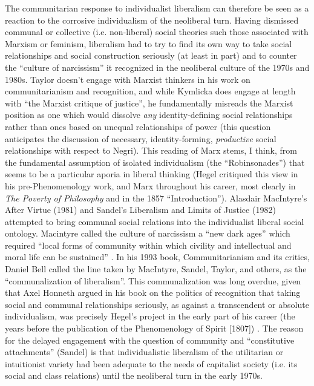 \documentclass[12pt,oneside]{memoir}
\begin{document}
The communitarian response to individualist liberalism can therefore be seen as a reaction to the corrosive individualism of the neoliberal turn. Having dismissed communal or collective (i.e. non-liberal) social theories such those associated with Marxism or feminism, liberalism had to try to find its own way to take social relationships and social construction seriously (at least in part) and to counter the ``culture of narcissism'' it recognized in the neoliberal culture of the 1970s and 1980s. Taylor doesn't engage with Marxist thinkers in his work on communitarianism and recognition, and while Kymlicka does engage at length with ``the Marxist critique of justice'', he fundamentally misreads the Marxist position as one which would dissolve \textit{any} identity-defining social relationships rather than ones based on unequal relationships of power \cite[102]{Kymlicka1989} (this question anticipates the discussion of necessary, identity-forming, \textit{productive} social relationships with respect to Negri). This reading of Marx stems, I think, from the fundamental assumption of isolated individualism (the ``Robinsonades'') that seems to be a particular aporia in liberal thinking (Hegel critiqued this view in his pre-Phenomenology work, and Marx throughout his career, most clearly in \textit{The Poverty of Philosophy} and in the 1857 ``Introduction'').
	 Alasdair MacIntyre's After Virtue (1981) and Sandel's Liberalism and Limits of Justice (1982)  attempted to bring communal social relations into the individualist liberal social ontology. Macintyre called the culture of narcissism a ``new dark ages'' which required ``local forms of community within which civility and intellectual and moral life can be sustained'' \citep{Macintyre1981}. In his 1993 book, Communitarianism and its critics, Daniel Bell called the line taken by MacIntyre, Sandel, Taylor, and others, as the ``communalization of liberalism''. This communalization was long overdue, given that Axel Honneth argued in his book on the politics of recognition that taking social and communal relationships seriously, as against a transcendent or absolute individualism, was precisely Hegel's project in the early part of his career (the years before the publication of the Phenomenology of Spirit [1807]) \citep{honneth-struggle}. The reason for the delayed engagement with the question of community and ``constitutive attachments'' (Sandel) is that individualistic liberalism of the utilitarian or intuitionist variety had been adequate to the needs of capitalist society (i.e. its social and class relations) until the neoliberal turn in the early 1970s.
\end{document}
